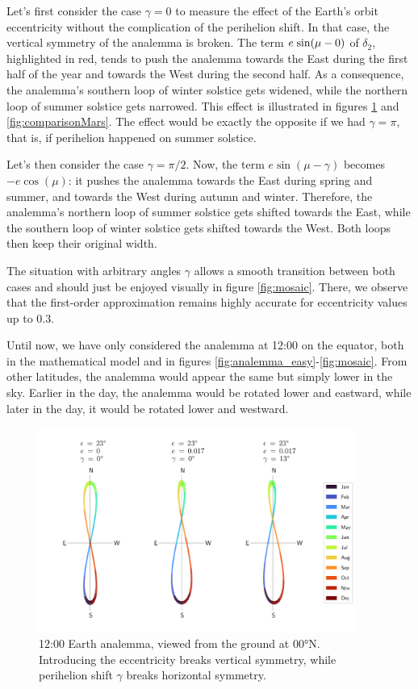 \documentclass[12pt]{article}
\newcommand{\Sin}{%
  \mathop{\sbox0{$\cos$}\makebox[\wd0][r]{$\sin$}}%
}
\begin{document}
Let's first consider the case $\gamma=0$ to measure the effect of the 
Earth's orbit eccentricity without the complication of the perihelion shift.
In that case, the vertical symmetry of the analemma is broken. The term 
$e\Sin(\mu-0)$ of $\delta_2$, highlighted in red, tends to push the 
analemma towards the East during the first half of the year and towards the 
West during the second half. 
As a consequence, the analemma's southern loop of winter solstice gets widened, 
while the northern loop of summer solstice gets narrowed. 
This effect is illustrated in figures 
\ref{fig:comparisonEarth} and \ref{fig:comparisonMars}.
The effect would be exactly the opposite if we had $\gamma=\pi$,
that is, if perihelion happened on summer solstice.

Let's then consider the case $\gamma=\pi/2$. Now, the term $e\sin(\mu-\gamma)$
becomes $-e\cos(\mu)$: it pushes the analemma towards the East during spring 
and summer, and towards the West during autumn and winter.
Therefore, the analemma's northern loop of summer solstice gets shifted
towards the East, while the southern loop of winter solstice gets shifted
towards the West. Both loops then keep their original width.

The situation with arbitrary angles $\gamma$ allows a smooth transition 
between both cases and should just be enjoyed visually in figure \ref{fig:mosaic}. 
There, we observe that the first-order approximation remains highly accurate 
for eccentricity values up to $0.3$.

Until now, we have only considered the analemma at 12:00 on the equator, both
in the mathematical model and in figures \ref{fig:analemma_easy}-\ref{fig:mosaic}. From other latitudes, the 
analemma would appear the same but simply lower in the sky. Earlier in 
the day, the analemma would be rotated lower and eastward, 
while later in the day, it would be rotated lower and westward.

\begin{figure}
    \centering
    \includegraphics[width=0.92\textwidth]{./figures/comparisonEarth.pdf}
    \caption{
        12:00 Earth analemma, viewed from the ground at 00°N. Introducing the 
        eccentricity breaks vertical symmetry, while perihelion shift 
        $\gamma$ breaks horizontal symmetry.
    }
    \label{fig:comparisonEarth}
\end{figure}
\end{document}
